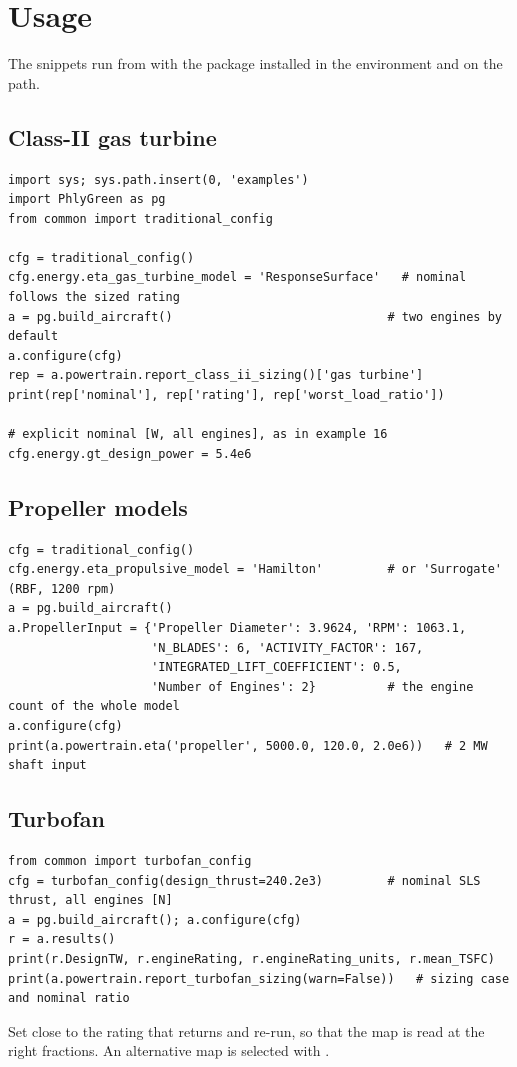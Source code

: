 \documentclass[a4paper,11pt]{article}
\begin{document}
\section{Usage}\label{sec:usage}

The snippets run from  with the package installed in the 
environment and  on the path.

\subsection{Class-II gas turbine}
\begin{lstlisting}
import sys; sys.path.insert(0, 'examples')
import PhlyGreen as pg
from common import traditional_config

cfg = traditional_config()
cfg.energy.eta_gas_turbine_model = 'ResponseSurface'   # nominal follows the sized rating
a = pg.build_aircraft()                              # two engines by default
a.configure(cfg)
rep = a.powertrain.report_class_ii_sizing()['gas turbine']
print(rep['nominal'], rep['rating'], rep['worst_load_ratio'])

# explicit nominal [W, all engines], as in example 16
cfg.energy.gt_design_power = 5.4e6
\end{lstlisting}

\subsection{Propeller models}
\begin{lstlisting}
cfg = traditional_config()
cfg.energy.eta_propulsive_model = 'Hamilton'         # or 'Surrogate' (RBF, 1200 rpm)
a = pg.build_aircraft()
a.PropellerInput = {'Propeller Diameter': 3.9624, 'RPM': 1063.1,
                    'N_BLADES': 6, 'ACTIVITY_FACTOR': 167,
                    'INTEGRATED_LIFT_COEFFICIENT': 0.5,
                    'Number of Engines': 2}          # the engine count of the whole model
a.configure(cfg)
print(a.powertrain.eta('propeller', 5000.0, 120.0, 2.0e6))   # 2 MW shaft input
\end{lstlisting}

\subsection{Turbofan}
\begin{lstlisting}
from common import turbofan_config
cfg = turbofan_config(design_thrust=240.2e3)         # nominal SLS thrust, all engines [N]
a = pg.build_aircraft(); a.configure(cfg)
r = a.results()
print(r.DesignTW, r.engineRating, r.engineRating_units, r.mean_TSFC)
print(a.powertrain.report_turbofan_sizing(warn=False))   # sizing case and nominal ratio
\end{lstlisting}
Set  close to the rating that 
returns and re-run, so that the map is read at the right fractions. An alternative map is
selected with .
\end{document}
